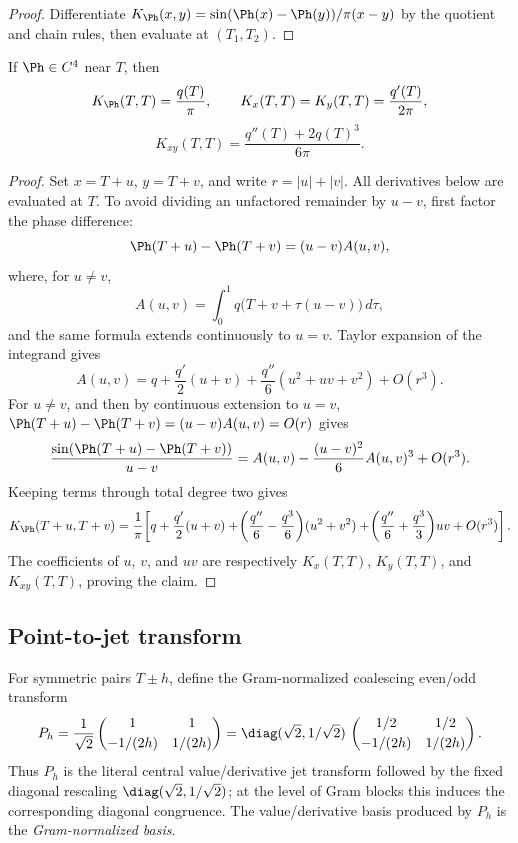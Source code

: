 \begin{proof}
Differentiate \(K_\Ph(x,y) = \sin(\Ph(x)-\Ph(y))/\pi(x-y)\) by the
quotient and chain rules, then evaluate at \((T_1, T_2)\).
\end{proof}

\begin{lemma}
\label{lem:phase-kernel-diagonal-derivatives}
If \(\Ph\in C^4\) near \(T\), then
\begin{equation}
\label{eq:diagonal-kernel-derivatives}
K_\Ph(T,T)=\frac{q(T)}{\pi},\qquad
K_x(T,T)=K_y(T,T)=\frac{q'(T)}{2\pi},
\end{equation}
\[
        K_{xy}(T,T)=\frac{q''(T)+2q(T)^3}{6\pi}.
\]
\end{lemma}

\begin{proof}
Set \(x=T+u\), \(y=T+v\), and write \(r=|u|+|v|\).  All derivatives
below are evaluated at \(T\).  To avoid dividing an unfactored remainder
by \(u-v\), first factor the phase difference:
\[
\Ph(T+u)-\Ph(T+v)=(u-v)A(u,v),
\]
where, for \(u\ne v\),
\[
A(u,v)=\int_0^1 q\bigl(T+v+\tau(u-v)\bigr)\,d\tau,
\]
and the same formula extends continuously to \(u=v\).  Taylor expansion
of the integrand gives
\[
A(u,v)
= q+\frac{q'}2(u+v)+\frac{q''}{6}(u^2+uv+v^2)+O(r^3).
\]
For \(u\ne v\), and then by continuous extension to \(u=v\),
\(\Ph(T+u)-\Ph(T+v)=(u-v)A(u,v)=O(r)\) gives
\[
\frac{\sin(\Ph(T+u)-\Ph(T+v))}{u-v}
= A(u,v)-\frac{(u-v)^2}{6}A(u,v)^3+O(r^3).
\]
Keeping terms through total degree two gives
\[
K_\Ph(T+u,T+v)
= \frac1\pi\!\left[
 q + \frac{q'}{2}(u+v)
 + \!\left(\frac{q''}{6} - \frac{q^3}{6}\right)\!(u^2+v^2)
 + \!\left(\frac{q''}{6} + \frac{q^3}{3}\right)\!uv
 + O(r^3)\right].
\]
The coefficients of \(u\), \(v\), and \(uv\) are respectively
\(K_x(T,T)\), \(K_y(T,T)\), and \(K_{xy}(T,T)\), proving the claim.
\end{proof}

\subsection{Point-to-jet transform}
\label{subsec:point-to-jet-transform}

For symmetric pairs \(T\pm h\), define the Gram-normalized coalescing
even/odd transform
\begin{equation}
\label{eq:point-to-jet-transform}
P_h
=\frac1{\sqrt2}
\begin{pmatrix}
1 & 1\\[0.6ex]
-1/(2h) & 1/(2h)
\end{pmatrix}
=\diag(\sqrt 2, 1/\sqrt 2)\,
\begin{pmatrix}
1/2 & 1/2\\[0.6ex]
-1/(2h) & 1/(2h)
\end{pmatrix}.
\end{equation}
Thus \(P_h\) is the literal central value/derivative jet transform
followed by the fixed diagonal rescaling
\(\diag(\sqrt 2, 1/\sqrt 2)\); at the level of Gram blocks this induces
the corresponding diagonal congruence.  The value/derivative basis
produced by \(P_h\) is the \emph{Gram-normalized basis}.

